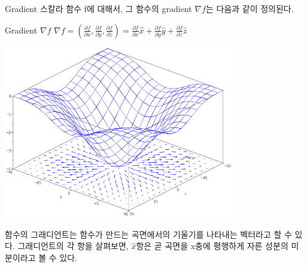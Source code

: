 \documentclass{beamer}
\begin{document}
\begin{frame}[allowframebreaks]{Gradient}
스칼라 함수 f에 대해서, 그 함수의 gradient $\nabla f$는 다음과 같이 정의된다. 
\begin{block}{Gradient $\nabla f$} 
$\nabla f = (\frac{\partial f}{\partial x}, \frac{\partial f}{\partial y},\frac{\partial f}{\partial z}) = \frac{\partial f}{\partial x} \hat{x} + \frac{\partial f}{\partial y} \hat{y} + \frac{\partial f}{\partial z} \hat{z}$
\end{block}

\includegraphics[width=10cm,keepaspectratio]{gradient}

함수의 그래디언트는 함수가 만드는 곡면에서의 기울기를 나타내는 벡터라고 할 수 있다. 그래디언트의 각 항을 살펴보면, $\hat{x}$항은 곧 곡면을 x충에 평행하게 자른 성분의 미분이라고 볼 수 있다. 
\end{frame} 





\end{document}
